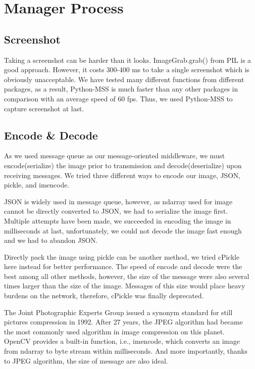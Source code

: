 \documentclass[runningheads]{llncs}
\begin{document}
\section{Manager Process}
\subsection{Screenshot}
Taking a screenshot can be harder than it looks. 
ImageGrab.grab() from PIL is a good approach. However, 
it costs 300-400 ms to take a single screenshot which is 
obviously unacceptable. We have tested many different 
functions from different packages, as a result, Python-MSS 
is much faster than any other packages in comparison with 
an average speed of 60 fps. Thus, we used Python-MSS to 
capture screenshot at last. 

\subsection{Encode \& Decode}
As we used message queue as our message-oriented middleware, 
we must encode(serialize) the image prior to transmission 
and decode(deserialize) upon receiving messages. We tried 
three different ways to encode our image, JSON, pickle, 
and imencode. 

JSON is widely used in message queue, however, as ndarray 
used for image cannot be directly converted to JSON, we had 
to serialize the image first. Multiple attempts have been 
made, we succeeded in encoding the image in milliseconds at 
last, unfortunately, we could not decode the image fast 
enough and we had to abandon JSON. 

Directly pack the image using pickle can be another method, 
we tried cPickle here instead for better performance. The 
speed of encode and decode were the best among all other 
methods, however, the size of the message were also several 
times larger than the size of the image. Messages of this 
size would place heavy burdens on the network, therefore, 
cPickle was finally deprecated. 

The Joint Photographic Experts Group issued a synonym 
standard for still pictures compression in 1992. After 
27 years, the JPEG algorithm had became the most commonly 
used algorithm in image compression on this planet. OpenCV 
provides a built-in function, i.e., imencode, which 
converts an image from ndarray to byte stream within 
milliseconds. And more importantly, thanks to JPEG 
algorithm, the size of message are also ideal. 
\end{document}
